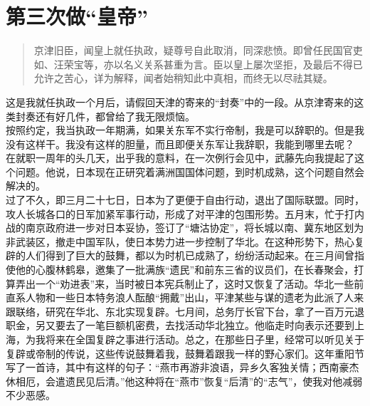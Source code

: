 \fancyhead[RO]{} %
\fancyhead[LE]{} %
\chapter*{第三次做“皇帝”}
\thispagestyle{empty}
\begin{quote}
	京津旧臣，闻皇上就任执政，疑尊号自此取消，同深悲愤。即曾任民国官吏如、汪荣宝等，亦以名义关系甚重为言。臣以皇上屡次坚拒，及最后不得已允许之苦心，详为解释，闻者始稍知此中真相，而终无以尽祛其疑。\\
\end{quote}

这是我就任执政一个月后，请假回天津的寄来的“封奏”中的一段。从京津寄来的这类封奏还有好几件，都曾给了我无限烦恼。\\

按照约定，我当执政一年期满，如果关东军不实行帝制，我是可以辞职的。但是我没有这样干。我没有这样的胆量，而且即便关东军让我辞职，我能到哪里去呢？\\

在就职一周年的头几天，出乎我的意料，在一次例行会见中，武藤先向我提起了这个问题。他说，日本现在正研究着满洲国国体问题，到时机成熟，这个问题自然会解决的。\\

过了不久，即三月二十七日，日本为了更便于自由行动，退出了国际联盟。同时，攻人长城各口的日军加紧军事行动，形成了对平津的包围形势。五月末，忙于打内战的南京政府进一步对日本妥协，签订了“塘沽协定”，将长城以南、冀东地区划为非武装区，撤走中国军队，使日本势力进一步控制了华北。在这种形势下，热心复辟的人们得到了巨大的鼓舞，都以为时机已成熟了，纷纷活动起来。在三月间曾指使他的心腹林鹤皋，邀集了一批满族“遗民”和前东三省的议员们，在长春聚会，打算弄出一个“劝进表”来，当时被日本宪兵制止了，这时又恢复了活动。华北一些前直系人物和一些日本特务浪人酝酿“拥戴”出山，平津某些与谋的遗老为此派了人来跟联络，研究在华北、东北实现复辟。七月间，总务厅长官下台，拿了一百万元退职金，另又要去了一笔巨额机密费，去找活动华北独立。他临走时向表示还要到上海，为我将来在全国复辟之事进行活动。总之，在那些日子里，经常可以听见关于复辟或帝制的传说，这些传说鼓舞着我，鼓舞着跟我一样的野心家们。这年重阳节写了一首诗，其中有这样的句子：“燕市再游非浪语，异乡久客独关情；西南豪杰休相厄，会遣遗民见后清。”他这种将在“燕市”恢复“后清”的“志气”，使我对他减弱不少恶感。\\

